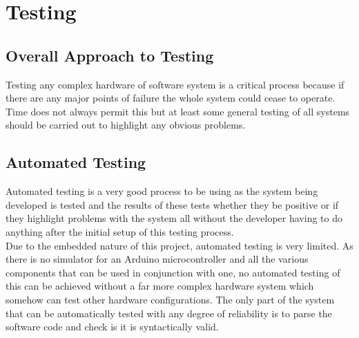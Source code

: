 \chapter{Testing}



\section{Overall Approach to Testing}
Testing any complex hardware of software system is a critical process because if there are any major points of failure the whole system could cease to operate.  Time does not always permit this but at least some general testing of all systems should be carried out to highlight any obvious problems.
\section{Automated Testing}
Automated testing is a very good process to be using as the system being developed is tested and the results of these tests whether they be positive or if they highlight problems with the system all without the developer having to do anything after the initial setup of this testing process.
\\Due to the embedded nature of this project, automated testing is very limited.  As there is no simulator for an Arduino microcontroller and all the various components that can be used in conjunction with one, no automated testing of this can be achieved without a far more complex hardware system which somehow can test other hardware configurations.  The only part of the system that can be automatically tested with any degree of reliability is to parse the software code and check is it is syntactically valid.
